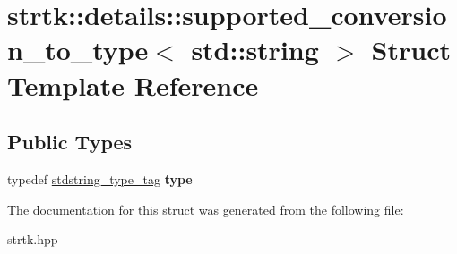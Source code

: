 \hypertarget{structstrtk_1_1details_1_1supported__conversion__to__type_3_01std_1_1string_01_4}{\section{strtk\-:\-:details\-:\-:supported\-\_\-conversion\-\_\-to\-\_\-type$<$ std\-:\-:string $>$ Struct Template Reference}
\label{structstrtk_1_1details_1_1supported__conversion__to__type_3_01std_1_1string_01_4}
}
\subsection*{Public Types}
\begin{DoxyCompactItemize}
\item 
\hypertarget{structstrtk_1_1details_1_1supported__conversion__to__type_3_01std_1_1string_01_4_a1ddf776535cfbba1d0b7919cacadd075}{typedef \hyperlink{structstrtk_1_1details_1_1stdstring__type__tag}{stdstring\-\_\-type\-\_\-tag} {\bfseries type}}\label{structstrtk_1_1details_1_1supported__conversion__to__type_3_01std_1_1string_01_4_a1ddf776535cfbba1d0b7919cacadd075}

\end{DoxyCompactItemize}


The documentation for this struct was generated from the following file\-:\begin{DoxyCompactItemize}
\item 
strtk.\-hpp\end{DoxyCompactItemize}
